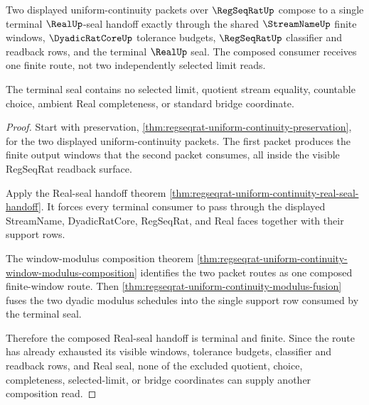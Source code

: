 \begin{theorem}
\label{thm:regseqrat-uniform-continuity-composition-terminal-seal}
Two displayed uniform-continuity packets over $\RegSeqRatUp$ compose to a
single terminal $\RealUp$-seal handoff exactly through the shared
$\StreamNameUp$ finite windows, $\DyadicRatCoreUp$ tolerance budgets,
$\RegSeqRatUp$ classifier and readback rows, and the terminal $\RealUp$ seal.
The composed consumer receives one finite route, not two independently selected
limit reads.

The terminal seal contains no selected limit, quotient stream equality,
countable choice, ambient Real completeness, or standard bridge coordinate.
\end{theorem}
\begin{proof}
Start with preservation,
\autoref{thm:regseqrat-uniform-continuity-preservation}, for the two displayed
uniform-continuity packets. The first packet produces the finite output windows
that the second packet consumes, all inside the visible RegSeqRat readback
surface.

Apply the Real-seal handoff theorem
\autoref{thm:regseqrat-uniform-continuity-real-seal-handoff}. It forces every
terminal consumer to pass through the displayed StreamName, DyadicRatCore,
RegSeqRat, and Real faces together with their support rows.

The window-modulus composition theorem
\autoref{thm:regseqrat-uniform-continuity-window-modulus-composition} identifies
the two packet routes as one composed finite-window route. Then
\autoref{thm:regseqrat-uniform-continuity-modulus-fusion} fuses the two dyadic
modulus schedules into the single support row consumed by the terminal seal.

Therefore the composed Real-seal handoff is terminal and finite. Since the
route has already exhausted its visible windows, tolerance budgets, classifier
and readback rows, and Real seal, none of the excluded quotient, choice,
completeness, selected-limit, or bridge coordinates can supply another
composition read.
\end{proof}
